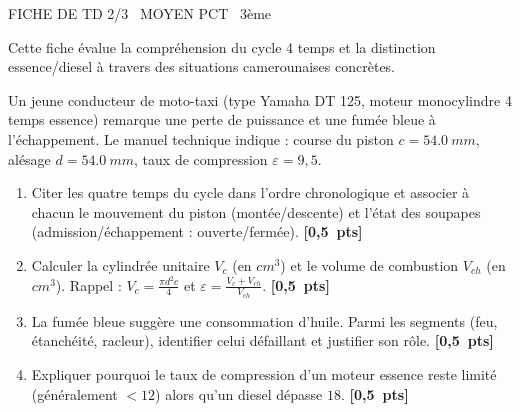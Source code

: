 \documentclass[11pt]{article}
\begin{document}
\begin{tcolorbox}[enhanced,colback=popink,colframe=popink,arc=10pt,boxrule=0pt,left=12pt,right=12pt,top=9pt,bottom=9pt]
{\color{white}\popxbold\small FICHE DE TD 2/3 \textbullet\ MOYEN \hfill PCT \textbullet\ 3ème\par}
\end{tcolorbox}
\vspace{4pt}
Cette fiche évalue la compréhension du cycle 4 temps et la distinction essence/diesel à travers des situations camerounaises concrètes.

\begin{exercice}
Un jeune conducteur de moto-taxi (type Yamaha DT 125, moteur monocylindre 4 temps essence) remarque une perte de puissance et une fumée bleue à l'échappement. Le manuel technique indique : course du piston $c = \SI{54,0}{mm}$, alésage $d = \SI{54,0}{mm}$, taux de compression $\varepsilon = 9,5$.
\providecommand{\bareme}[1]{\quad\textbf{[#1~pts]}}
\begin{enumerate}
    \item Citer les quatre temps du cycle dans l'ordre chronologique et associer à chacun le mouvement du piston (montée/descente) et l'état des soupapes (admission/échappement : ouverte/fermée). \bareme{0,5}
    \item Calculer la cylindrée unitaire $V_c$ (en $\si{cm^3}$) et le volume de combustion $V_{ch}$ (en $\si{cm^3}$). Rappel : $V_c = \frac{\pi d^2 c}{4}$ et $\varepsilon = \frac{V_c + V_{ch}}{V_{ch}}$. \bareme{0,5}
    \item La fumée bleue suggère une consommation d'huile. Parmi les segments (feu, étanchéité, racleur), identifier celui défaillant et justifier son rôle. \bareme{0,5}
    \item Expliquer pourquoi le taux de compression d'un moteur essence reste limité (généralement $< 12$) alors qu'un diesel dépasse $18$. \bareme{0,5}
\end{enumerate}
\end{exercice}
\end{document}
